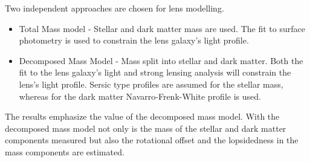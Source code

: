 \documentclass{article}
\begin{document}
Two independent approaches are chosen for lens modelling\cite{Nightingale_2019}.

\begin{itemize}
    \item Total Mass model - Stellar and dark matter mass are used. The fit to surface photometry is used to constrain the lens galaxy's light profile\cite{Nightingale_2019}.
    \item Decomposed Mass Model - Mass split into stellar and dark matter. Both the fit to the lens galaxy's light and strong lensing analysis will constrain the lens's light profile. Sersic type profiles are assumed for the stellar mass, whereas for the dark matter Navarro-Frenk-White profile is used\cite{Nightingale_2019}.
\end{itemize}

The results emphasize the value of the decomposed mass model. With the decomposed mass model not only is the mass of the stellar and dark matter components measured but also the rotational offset and the lopsidedness in the mass components are estimated.

\newpage

\printbibliography
\end{document}
